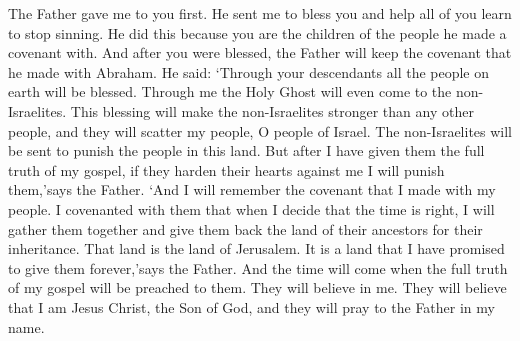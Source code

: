 The Father gave me to you first. He sent me to bless you and help all of you learn to stop sinning. He did this because you are the children of the people he made a covenant with.
\bverse \iffalse And after that ye were blessed then fulfilleth the Father the covenant which he made with Abraham, saying: In thy seed shall all the kindreds of the earth be blessed--unto the pouring out of the Holy Ghost through me upon the Gentiles, which blessing upon the Gentiles shall make them mighty above all, unto the scattering of my people, O house of Israel. \fi
And after you were blessed, the Father will keep the covenant that he made with Abraham. He said: \lq Through your descendants all the people on earth will be blessed. Through me the Holy Ghost will even come to the non-Israelites. This blessing will make the non-Israelites stronger than any other people, and they will scatter my people, O people of Israel.
\bverse \iffalse And they shall be a scourge unto the people of this land.  Nevertheless, when they shall have received the fulness of my gospel, then if they shall harden their hearts against me I will return their iniquities upon their own heads, saith the Father. \fi
The non-Israelites will be sent to punish the people in this land. But after I have given them the full truth of my gospel, if they harden their hearts against me I will punish them,\rq says the Father.
\bverse \iffalse And I will remember the covenant which I have made with my people; and I have covenanted with them that I would gather them together in mine own due time, that I would give unto them again the land of their fathers for their inheritance, which is the land of Jerusalem, which is the promised land unto them forever, saith the Father. \fi
\lq And I will remember the covenant that I made with my people. I covenanted with them that when I decide that the time is right, I will gather them together and give them back the land of their ancestors for their inheritance. That land is the land of Jerusalem. It is a land that I have promised to give them forever,\rq says the Father.
\bverse \iffalse And it shall come to pass that the time cometh, when the fulness of my gospel shall be preached unto them; \fi
And the time will come when the full truth of my gospel will be preached to them.
\bverse \iffalse And they shall believe in me, that I am Jesus Christ, the Son of God, and shall pray unto the Father in my name. \fi
They will believe in me. They will believe that I am Jesus Christ, the Son of God, and they will pray to the Father in my name.
